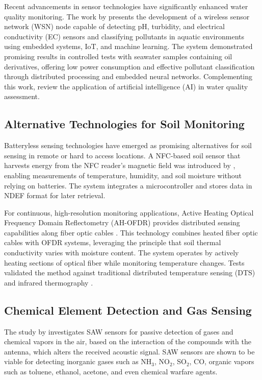 \documentclass[conference]{IEEEtran}
\begin{document}
Recent advancements in sensor technologies have significantly enhanced water quality monitoring. The work by \cite{ferreira_2023_conception} presents the development of a wireless sensor network (WSN) node capable of detecting pH, turbidity, and electrical conductivity (EC) sensors and classifying pollutants in aquatic environments using embedded systems, IoT, and machine learning. The system demonstrated promising results in controlled tests with seawater samples containing oil derivatives, offering low power consumption and effective pollutant classification through distributed processing and embedded neural networks. Complementing this work, \cite{nr_2025_ai} review the application of artificial intelligence (AI) in water quality assessment.

\subsection{Alternative Technologies for Soil Monitoring}

Batteryless sensing technologies have emerged as promising alternatives for soil sensing in remote or hard to access locations. A NFC-based soil sensor that harvests energy from the NFC reader’s magnetic field was introduced by \cite{boada_2018_batteryless}, enabling measurements of temperature, humidity, and soil moisture without relying on batteries. The system integrates a microcontroller and stores data in NDEF format for later retrieval. 

For continuous, high-resolution monitoring applications, Active Heating Optical Frequency Domain Reflectometry (AH-OFDR) provides distributed sensing capabilities along fiber optic cables \cite{sun_2024_highresolution}. This technology combines heated fiber optic cables with OFDR systems, leveraging the principle that soil thermal conductivity varies with moisture content. The system operates by actively heating sections of optical fiber while monitoring temperature changes. Tests validated the method against traditional distributed temperature sensing (DTS) and infrared thermography \cite{sun_2024_highresolution}.

\subsection{Chemical Element Detection and Gas Sensing}

The study by \cite{devkota_2017_saw} investigates SAW sensors for passive detection of gases and chemical vapors in the air, based on the interaction of the compounds with the antenna, which alters the received acoustic signal. SAW sensors are shown to be viable for detecting inorganic gases such as NH$_3$, NO$_2$, SO$_2$, CO, organic vapors such as toluene, ethanol, acetone, and even chemical warfare agents.
\end{document}
